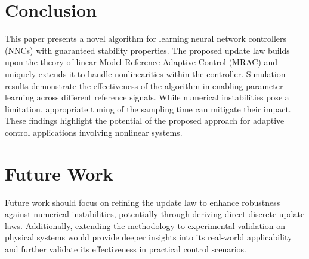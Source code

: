 \section{Conclusion}
This paper presents a novel algorithm for learning neural network controllers (NNCs) with guaranteed stability properties. The proposed update law builds upon the theory of linear Model Reference Adaptive Control (MRAC) and uniquely extends it to handle nonlinearities within the controller. Simulation results demonstrate the effectiveness of the algorithm in enabling parameter learning across different reference signals. While numerical instabilities pose a limitation, appropriate tuning of the sampling time can mitigate their impact. These findings highlight the potential of the proposed approach for adaptive control applications involving nonlinear systems.




\section{Future Work}

Future work should focus on refining the update law to enhance robustness against numerical instabilities, potentially through deriving direct discrete update laws. Additionally, extending the methodology to experimental validation on physical systems would provide deeper insights into its real-world applicability and further validate its effectiveness in practical control scenarios.